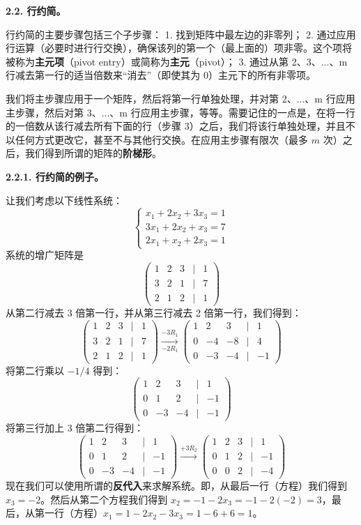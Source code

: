 \textbf{2.2. 行约简。}

行约简的主要步骤包括三个子步骤：
1. 找到矩阵中最左边的非零列；
2. 通过应用行运算（必要时进行行交换），确保该列的第一个（最上面的）项非零。这个项将被称为\textbf{主元项}（pivot entry）或简称为\textbf{主元}（pivot）；
3. 通过从第 2、3、...、m 行减去第一行的适当倍数来“消去”（即使其为 0）主元下的所有非零项。

我们将主步骤应用于一个矩阵，然后将第一行单独处理，并对第 2、...、m 行应用主步骤，然后对第 3、...、m 行应用主步骤，等等。需要记住的一点是，在将一行的一倍数从该行减去所有下面的行（步骤 3）之后，我们将该行单独处理，并且不以任何方式更改它，甚至不与其他行交换。在应用主步骤有限次（最多 $m$ 次）之后，我们得到所谓的矩阵的\textbf{阶梯形}。

\textbf{2.2.1. 行约简的例子。}

让我们考虑以下线性系统：
$$
\begin{cases}
x_1 + 2x_2 + 3x_3 = 1 \\
3x_1 + 2x_2 + x_3 = 7 \\
2x_1 + x_2 + 2x_3 = 1
\end{cases}
$$
系统的增广矩阵是
$$
\begin{pmatrix} 1 & 2 & 3 & | & 1 \\ 3 & 2 & 1 & | & 7 \\ 2 & 1 & 2 & | & 1 \end{pmatrix}
$$
从第二行减去 3 倍第一行，并从第三行减去 2 倍第一行，我们得到：
$$
\begin{pmatrix} 1 & 2 & 3 & | & 1 \\ 3 & 2 & 1 & | & 7 \\ 2 & 1 & 2 & | & 1 \end{pmatrix} \xrightarrow[-2R_1]{-3R_1} \begin{pmatrix} 1 & 2 & 3 & | & 1 \\ 0 & -4 & -8 & | & 4 \\ 0 & -3 & -4 & | & -1 \end{pmatrix}
$$
将第二行乘以 $-1/4$ 得到：
$$
\begin{pmatrix} 1 & 2 & 3 & | & 1 \\ 0 & 1 & 2 & | & -1 \\ 0 & -3 & -4 & | & -1 \end{pmatrix}
$$
将第三行加上 3 倍第二行得到：
$$
\begin{pmatrix} 1 & 2 & 3 & | & 1 \\ 0 & 1 & 2 & | & -1 \\ 0 & -3 & -4 & | & -1 \end{pmatrix} \xrightarrow{+3R_2} \begin{pmatrix} 1 & 2 & 3 & | & 1 \\ 0 & 1 & 2 & | & -1 \\ 0 & 0 & 2 & | & -4 \end{pmatrix}
$$
现在我们可以使用所谓的\textbf{反代入}来求解系统。即，从最后一行（方程）我们得到 $x_3 = -2$。然后从第二个方程我们得到 $x_2 = -1 - 2x_3 = -1 - 2(-2) = 3$，最后，从第一行（方程）$x_1 = 1 - 2x_2 - 3x_3 = 1 - 6 + 6 = 1$。

